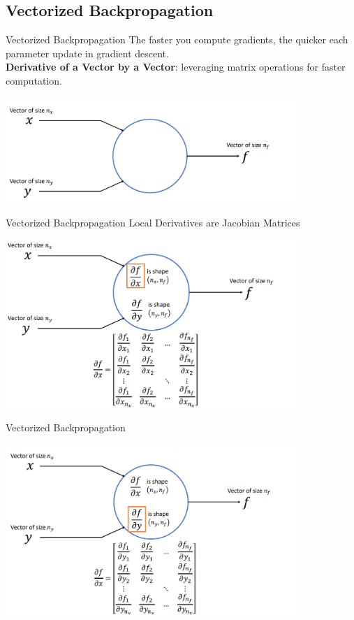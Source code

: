 \documentclass[serif, aspectratio=169]{beamer}
\begin{document}
\subsection{Vectorized Backpropagation}
\begin{frame}{Vectorized Backpropagation}
    The faster you compute gradients, the quicker each parameter update in gradient descent.
   \\ \textbf{Derivative of a Vector by a Vector}: leveraging matrix operations for faster computation.
    \begin{center}
        \includegraphics[width=11cm]{pic/vec2.png}  
    \end{center}
\end{frame}

\begin{frame}{Vectorized Backpropagation}
    Local Derivatives are Jacobian Matrices
    \begin{center}
        \includegraphics[width=11cm]{pic/vec.png}  
    \end{center}
\end{frame}

\begin{frame}{Vectorized Backpropagation}
    \begin{center}
        \includegraphics[width=11cm]{pic/vec3.png}  
    \end{center}
\end{frame}
\end{document}
